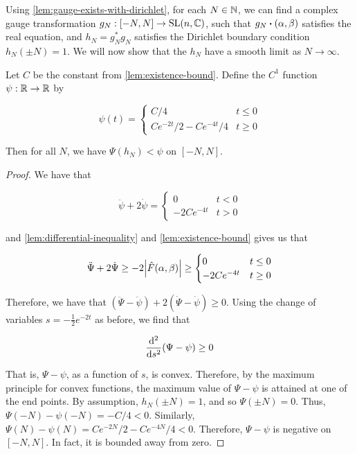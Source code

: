 \documentclass{article}
\begin{document}
Using \cref{lem:gauge-exists-with-dirichlet}, for each \(N \in \mathbb{N}\), we can find a complex gauge transformation \(g_N : [-N, N] \to \operatorname{SL}(n, \mathbb{C})\), such that \(g_N \vdot (\alpha, \beta)\) satisfies the real equation, and \(h_N = g_N^*g_N\) satisfies the Dirichlet boundary condition \(h_N(\pm N) = 1\). We will now show that the \(h_N\) have a smooth limit as \(N \to \infty\).

\begin{lemma}
    \label{lem:uniform-bound}
    Let \(C\) be the constant from \cref{lem:existence-bound}. Define the \(C^1\) function \(\psi : \mathbb{R} \to \mathbb{R}\) by

    \[\psi(t) = \begin{cases}
        C/4 & t \le 0 \\
        Ce^{-2t}/2 - Ce^{-4t}/4 & t \ge 0
    \end{cases}\]

    Then for all \(N\), we have \(\Psi(h_N) < \psi\) on \([-N, N]\).
\end{lemma}

\begin{proof}
    We have that

    \[\ddot \psi + 2\dot\psi = \begin{cases}
        0 & t < 0 \\
        -2Ce^{-4t} & t > 0
    \end{cases}\]

    and \cref{lem:differential-inequality} and \cref{lem:existence-bound} gives us that

    \[\ddot\Psi + 2\dot\Psi \ge -2\abs{\hat F(\alpha, \beta)} \ge \begin{cases}
        0 & t \le 0 \\
        -2Ce^{-4t} & t \ge 0
    \end{cases}\]

    Therefore, we have that \((\ddot\Psi - \ddot\psi) + 2(\dot\Psi - \dot\psi) \ge 0\). Using the change of variables \(s = -\frac12e^{-2t}\) as before, we find that

    \[\dv[2]{s}(\Psi - \psi) \ge 0\]

    That is, \(\Psi - \psi\), as a function of \(s\), is convex. Therefore, by the maximum principle for convex functions, the maximum value of \(\Psi - \psi\) is attained at one of the end points. By assumption, \(h_N(\pm N) = 1\), and so \(\Psi(\pm N) = 0\). Thus, \(\Psi(-N) - \psi(-N) = -C/4 < 0\). Similarly, \(\Psi(N) - \psi(N) = Ce^{-2N}/2 - Ce^{-4N}/4 < 0\). Therefore, \(\Psi - \psi\) is negative on \([-N, N]\). In fact, it is bounded away from zero.
\end{proof}
\end{document}
